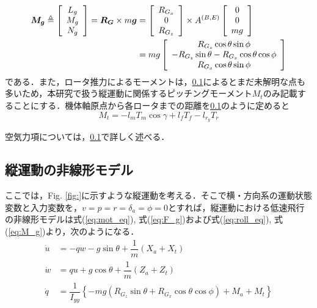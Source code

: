\begin{equation}
  \begin{split}
    \mbox{\boldmath $M_g$} \triangleq
    \left[
    \begin{array}{ccc}
      L_g \\
      M_g \\
      N_g
    \end{array}
    \right] =
    \mbox{\boldmath $R_G$} \times
    m\mbox{\boldmath $g$} &=
    \left[
    \begin{array}{ccc}
      R_{G_x} \\
      0 \\
      R_{G_z}
    \end{array}
    \right] \times
    A^{(B,E)}
    \left[
    \begin{array}{ccc}
      0 \\
      0 \\
      mg
    \end{array}
    \right] \\
    &= mg
    \left[
    \begin{array}{ccc}
      R_{G_z}\cos\theta\sin\phi \\
      -R_{G_z}\sin\theta - R_{G_x}\cos\theta\cos\phi \\
      R_{G_x}\cos\theta\sin\phi
    \end{array}
    \right]
  \end{split}
  \label{eq:M_g}
\end{equation}
である．また，ロータ推力によるモーメントは，\ref{}によるとまだ未解明な点も多いため，本研究で扱う縦運動に関係するピッチングモーメント$M_t$のみ記載することにする．機体軸原点から各ロータまでの距離を\ref{}のように定めると
\begin{equation}
  M_t = -l_m T_m \cos\gamma + l_f T_f - l_{r_y} T_r
\end{equation}

空気力項については，\ref{}で詳しく述べる．

\subsection{縦運動の非線形モデル}

ここでは，Fig. \ref{fig:}に示すような縦運動を考える．そこで横・方向系の運動状態変数と入力変数を，$v=p=r=\delta_a=\phi=0$とすれば，縦運動における低速飛行の非線形モデルは式(\ref{eq:mot_eq}), 式(\ref{eq:F_g})および式(\ref{eq:roll_eq}), 式(\ref{eq:M_g})より，次のようになる．
\begin{align}
  \dot{u} &= -qw - g\sin\theta +\dfrac{1}{m}(X_a + X_t) \\
  \dot{w} &= qu + g\cos\theta +\dfrac{1}{m}(Z_a + Z_t) \\
  \dot{q} &= \dfrac{1}{I_{yy}}\left\{-mg(R_{G_z}\sin\theta+R_{G_x}\cos\theta\cos\phi) + M_a + M_t\right\}
\end{align}

